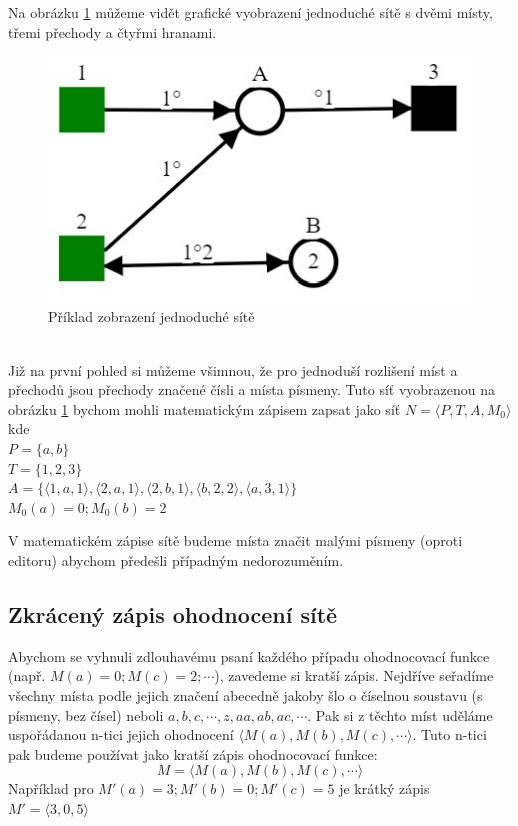 \documentclass[
  biblatex,
  glossaries,
]{kidiplom}
\begin{document}
Na obrázku \ref{fig:jednoduchá síť zobrazení} můžeme vidět grafické 
vyobrazení jednoduché sítě s dvěmi místy, třemi přechody a čtyřmi hranami.
\begin{figure}[h]
  \centering
  \includegraphics[scale=0.8]{simple_net}
  \caption{Příklad zobrazení jednoduché sítě}\label{fig:jednoduchá síť zobrazení}
\end{figure}
\\Již na první pohled si můžeme všimnou, že pro jednoduší rozlišení 
míst a přechodů jsou přechody značené čísli a místa písmeny.
Tuto síť vyobrazenou na obrázku \ref{fig:jednoduchá síť zobrazení} 
bychom mohli matematickým zápisem zapsat jako síť 
$ N = \langle P,T,A,M_{0}\rangle $
kde \\
$P = \{a,b\}$ \\
$T = \{1,2,3\}$ \\
$A = \{
  \langle 1,a,1 \rangle,
  \langle 2,a,1 \rangle,
  \langle 2,b,1 \rangle,
  \langle b,2,2 \rangle,
  \langle a,3,1 \rangle
\}$ \\
$M_{0}(a) = 0; M_{0}(b) = 2$

V matematickém zápise sítě budeme místa značit malými písmeny (oproti editoru)
abychom předešli případným nedorozuměním.


\subsection{Zkrácený zápis ohodnocení sítě}

Abychom se vyhnuli zdlouhavému psaní každého případu ohodnocovací funkce
\\(např. $M(a) = 0; M(c) = 2; \dotsb$), zavedeme si kratší zápis.
Nejdříve seřadíme všechny místa podle jejich značení abecedně jakoby šlo 
o číselnou soustavu (s písmeny, bez čísel) 
neboli $a, b, c, \dotsb, z, aa, ab, ac, \dotsb$.
Pak si z těchto míst uděláme uspořádanou n-tici jejich ohodnocení $\langle M(a), M(b), M(c), \dotsb \rangle$.
Tuto n-tici pak budeme používat jako kratší zápis ohodnocovací funkce:
$$
 M = \langle M(a), M(b), M(c), \dotsb \rangle
$$
Například pro $M'(a) = 3; M'(b) = 0; M'(c) = 5$ je krátký zápis $M' = \langle 3,0,5 \rangle$
\end{document}
